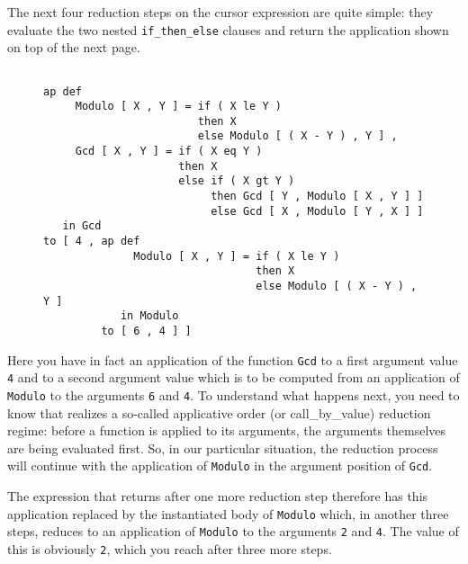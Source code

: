 The next  four reduction steps on the cursor expression are quite simple: they
evaluate the two nested {\tt if\_then\_else} clauses and return the application shown on top of the next page.
\begin{figure}
\begin{verbatim}

ap def 
     Modulo [ X , Y ] = if ( X le Y )
                        then X
                        else Modulo [ ( X - Y ) , Y ] ,
     Gcd [ X , Y ] = if ( X eq Y )
                     then X
                     else if ( X gt Y )
                          then Gcd [ Y , Modulo [ X , Y ] ]
                          else Gcd [ X , Modulo [ Y , X ] ]
   in Gcd
to [ 4 , ap def 
              Modulo [ X , Y ] = if ( X le Y )
                                 then X
                                 else Modulo [ ( X - Y ) , Y ]
            in Modulo
         to [ 6 , 4 ] ]

\end{verbatim}
\end{figure}
Here you have in fact an application of the function {\tt Gcd} to a first
argument value {\tt 4} and to a second argument value which is to be computed
from an application of {\tt Modulo} to the arguments {\tt 6} and {\tt 4}.
To understand what happens next, you need to know that \pired realizes
a so-called {\mys applicative order} (or {\mys call\_by\_value})
reduction regime: before a function is applied to its arguments, the
arguments themselves are being evaluated first. So, in our particular
situation, the reduction process will continue with the application of
{\tt Modulo} in the argument position of {\tt Gcd}.

The expression that returns after one more reduction step therefore has this
application replaced by the instantiated body of {\tt Modulo} which, in
another three steps, reduces to an application of {\tt Modulo} to
the arguments {\tt 2} and {\tt 4}. The value of this is obviously {\tt 2},
which you reach after three more steps. 

